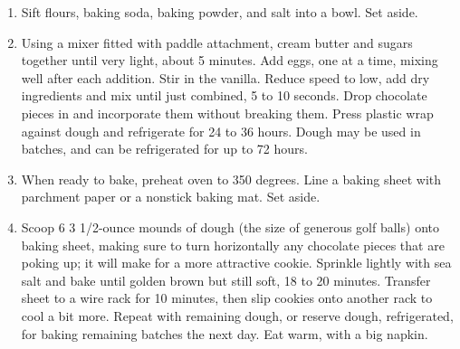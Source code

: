 
\begin{ingredients}
\end{ingredients}


\begin{recipe}
  \begin{enumerate}

  \item Sift flours, baking soda, baking powder, and salt into a bowl.
    Set aside.

  \item   Using a mixer fitted with paddle attachment, cream butter
    and sugars together until very light, about 5 minutes. Add eggs,
    one at a time, mixing well after each addition. Stir in the
    vanilla. Reduce speed to low, add dry ingredients and mix until
    just combined, 5 to 10 seconds. Drop chocolate pieces in and
    incorporate them without breaking them. Press plastic wrap against
    dough and refrigerate for 24 to 36 hours. Dough may be used in
    batches, and can be refrigerated for up to 72 hours.

  \item   When ready to bake, preheat oven to 350 degrees. Line a
    baking sheet with parchment paper or a nonstick baking mat. Set
    aside.

  \item   Scoop 6 3 1/2-ounce mounds of dough (the size of generous
    golf balls) onto baking sheet, making sure to turn horizontally
    any chocolate pieces that are poking up; it will make for a more
    attractive cookie. Sprinkle lightly with sea salt and bake until
    golden brown but still soft, 18 to 20 minutes. Transfer sheet to a
    wire rack for 10 minutes, then slip cookies onto another rack to
    cool a bit more. Repeat with remaining dough, or reserve dough,
    refrigerated, for baking remaining batches the next day. Eat warm,
    with a big napkin.

  \end{enumerate}
\end{recipe}
